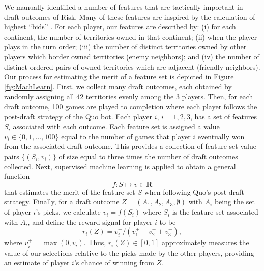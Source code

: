 \documentclass[letterpaper]{article}
\numberwithin{equation}{section}
\numberwithin{theorem}{section}
\numberwithin{lemma}{section}
\numberwithin{df}{section}
\begin{document}
We manually identified a number of features that are tactically important in draft outcomes of Risk.  Many of these features are inspired by the calculation of highest ``bids'' \cite{RiskBots}.  For each player, our features are described by: (i) for each continent, the number of territories owned in that continent; (ii) when the player plays in the turn order; (iii) the number of distinct territories owned by other players which border owned territories (enemy neighbors); and (iv) the number of distinct ordered pairs of owned territories which are adjacent (friendly neighbors).  Our process for estimating the merit of a feature set is depicted in Figure \ref{fig:MachLearn}.  First, we collect many draft outcomes, each obtained by randomly assigning all 42 territories evenly among the 3 players.  Then, for each draft outcome, 100 games are played to completion where each player follows the post-draft strategy of the Quo bot.  Each player $i$, $i=1,2,3$, has a set of features $S_i$ associated with each outcome.  Each feature set is assigned a value $v_i \in \{0,1,...,100\}$ equal to the number of games that player $i$ eventually won from the associated draft outcome.  This provides a collection of feature set value pairs $\{(S_i, v_i)\}$ of size equal to three times the number of draft outcomes collected.  Next, supervised machine learning is applied to obtain a general function
\[ f: S \mapsto v \in \textbf{R} \] 
that estimates the merit of the feature set $S$ when following Quo's post-draft strategy.  Finally, for a draft outcome $Z = (A_1,A_2,A_3,\emptyset)$ with $A_i$ being the set of player $i$'s picks, we calculate $v_i = f(S_i)$ where $S_i$ is the feature set associated with $A_i$, and define the reward signal for player $i$ to be
\[ r_i(Z) = v_i^+ / \left(v_1^+ + v_2^+ + v_3^+\right), \]
where $v_i^+ = \max(0, v_i)$.  %
Thus, $r_i(Z) \in [0, 1]$ approximately measures the value of our selections relative to the picks made by the other players, providing an estimate of player $i$'s chance of winning from $Z$.
\end{document}
